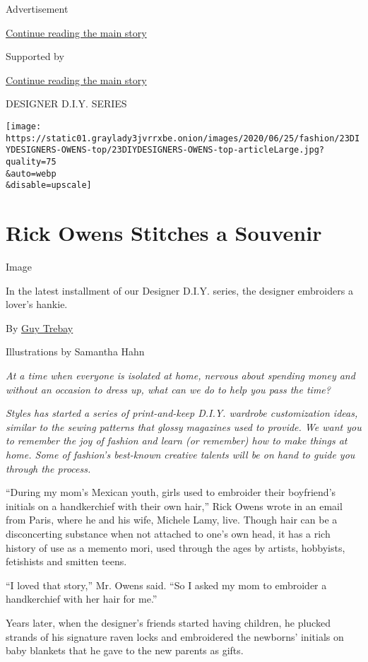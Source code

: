 Advertisement

\protect\hyperlink{after-top}{Continue reading the main story}

Supported by

\protect\hyperlink{after-sponsor}{Continue reading the main story}

DESIGNER D.I.Y. SERIES

\texttt{[image: https://static01.graylady3jvrrxbe.onion/images/2020/06/25/fashion/23DIYDESIGNERS-OWENS-top/23DIYDESIGNERS-OWENS-top-articleLarge.jpg?quality=75\\\&auto=webp\\\&disable=upscale]}

\hypertarget{rick-owens-stitches-a-souvenir}{%
\section{Rick Owens Stitches a
Souvenir}\label{rick-owens-stitches-a-souvenir}}

Image

In the latest installment of our Designer D.I.Y. series, the designer
embroiders a lover's hankie.

By \href{https://www.nytimes3xbfgragh.onion/by/guy-trebay}{Guy Trebay}

Illustrations by Samantha Hahn

\emph{At a time when everyone is isolated at home, nervous about
spending money and without an occasion to dress up, what can we do to
help you pass the time?}

\emph{Styles has started a series of print-and-keep D.I.Y. wardrobe
customization ideas, similar to the sewing patterns that glossy
magazines used to provide. We want you to remember the joy of fashion
and learn (or remember) how to make things at home. Some of fashion's
best-known creative talents will be on hand to guide you through the
process.}

``During my mom's Mexican youth, girls used to embroider their
boyfriend's initials on a handkerchief with their own hair,'' Rick Owens
wrote in an email from Paris, where he and his wife, Michele Lamy, live.
Though hair can be a disconcerting substance when not attached to one's
own head, it has a rich history of use as a memento mori, used through
the ages by artists, hobbyists, fetishists and smitten teens.

``I loved that story,'' Mr. Owens said. ``So I asked my mom to embroider
a handkerchief with her hair for me.''

Years later, when the designer's friends started having children, he
plucked strands of his signature raven locks and embroidered the
newborns' initials on baby blankets that he gave to the new parents as
gifts.

